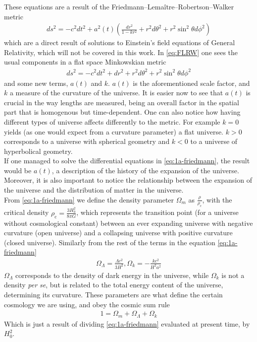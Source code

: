 These equations are a result of the Friedmann–Lemaître–Robertson–Walker metric 
\begin{align}
	ds ^2 = -c^2 dt^2  + a^2(t) \left( \frac{dr^2}{1-kr^2} +r^2d\theta ^2 + r^2 \sin^2\theta d\phi^2\right) 
	\label{eq:FLRW}
\end{align}which are a direct result of solutions to Einstein's field equations of General Relativity, which will not be covered in this work. In \eqref{eq:FLRW} one sees the usual components in a flat space Minkowskian metric 
\begin{align}
	ds^2 = -c^2dt^2 + dr^2 + r^2d\theta^2 + r^2 \sin^2\theta d\phi^2
\end{align} and some new terms, $a(t)$ and $k$. $a(t)$ is the aforementioned scale factor, and $k$ a measure of the curvature of the universe. It is easier now to see that $a(t)$ is crucial in the way lengths are measured, being an overall factor in the spatial part that is homogenous but time-dependent. One can also notice how having different types of universe affects differently to the metric. For example $k=0$ yields (as one would expect from a curvature parameter) a flat universe. $k>0$ corresponds to a universe with spherical geometry and $k<0$ to a universe of hyperbolical geometry. \\

If one managed to solve the differential equations in \eqref{eq:1a-friedmann}, the result would be $a(t)$, a description of the history of the expansion of the universe. Moreover, it is also important to notice the relationship between the expansion of the universe and the distribution of matter in the universe. \\

From \eqref{eq:1a-friedmann} we define the density parameter $\Omega_m$ as $\frac{\rho}{\rho_{\text{c}}}$, with the critical density $\rho_{\text{c}} = \frac{3H_0^2}{8\pi G}$, which represents the transition point (for a universe without cosmological constant) between an ever expanding universe with negative curvature (open universe) and a collapsing universe with positive curvature (closed universe). Similarly from the rest of the terms in the equation \eqref{eq:1a-friedmann}
\begin{align}
 \Omega_\Lambda = \frac{\Lambda c^2}{3H^2}, \Omega_k = -\frac{kc^2}{H^2a^2} 
 \label{eq:definitions}
\end{align}
$\Omega_\Lambda$ corresponds to the density of dark energy in the universe, while $\Omega_k$ is not a density \textit{per se}, but is related to the total energy content of the universe, determining its curvature.
These parameters are what define the certain cosmology we are using, and obey the cosmic sum rule 
\begin{align}
	1 = \Omega_m + \Omega_\Lambda + \Omega_k
	\label{eq:cosmic-sum-rule}
\end{align}
Which is just a result of dividing \eqref{eq:1a-friedmann} evaluated at present time, by  $H_0^2$. \\

